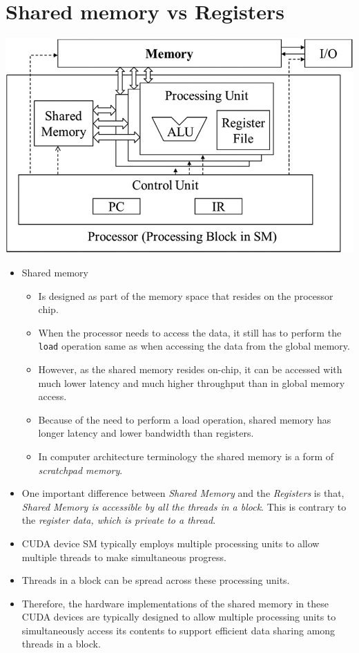 \section{Shared memory vs Registers}
\begin{center}
      \includegraphics[width=0.5\linewidth]{Images/Memories/CUDA_device_SM.png}
\end{center}
\begin{itemize}
      \item Shared memory
            \begin{itemize}
                  \item Is designed as part of the memory space that resides on the processor chip.
                  \item When the processor needs to access the data, it still has to perform the \texttt{load} operation same as when accessing the data from the global memory.
                  \item However, as the shared memory resides on-chip, it can be accessed with much lower latency and much higher throughput than in global memory access.
                  \item Because of the need to perform a load operation, shared memory has longer latency and lower bandwidth than registers.
                  \item In computer architecture terminology the shared memory is a form of \textsl{scratchpad memory}.
            \end{itemize}
      \item One important difference between \textsl{Shared Memory} and the \textsl{Registers} is that, \textsl{Shared Memory is accessible by all the threads in a block}. This is contrary to the \textsl{register data, which is private to a thread}.
      \item CUDA device SM typically employs multiple processing units to allow multiple threads to make simultaneous progress.
      \item Threads in a block can be spread across these processing units.
      \item Therefore, the hardware implementations of the shared memory in these CUDA devices are typically designed to allow multiple processing units to simultaneously access its contents to support efficient data sharing among threads in a block.
\end{itemize}

